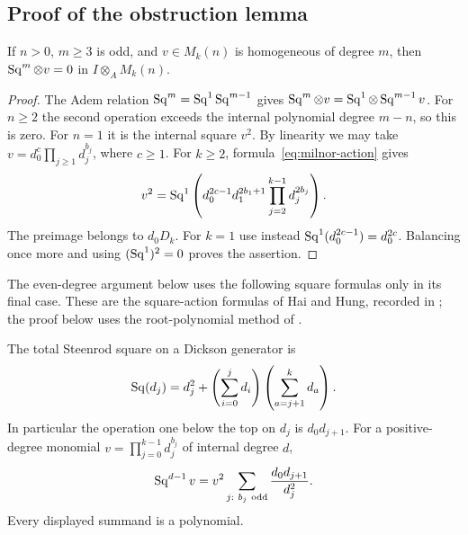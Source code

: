 \subsection{Proof of the obstruction lemma}

\begin{lemma}\label{lem:algebra-odd-tensor}
If $n>0$, $m\geq3$ is odd, and $v\in M_k(n)$ is homogeneous of
degree $m$, then $\operatorname{Sq}^m\otimes v=0$ in $I\otimes_AM_k(n)$.
\end{lemma}

\begin{proof}
The Adem relation $\operatorname{Sq}^m=\operatorname{Sq}^1\operatorname{Sq}^{m-1}$ gives
$\operatorname{Sq}^m\otimes v=\operatorname{Sq}^1\otimes\operatorname{Sq}^{m-1}v$.
For $n\geq2$ the second operation exceeds the internal polynomial
degree $m-n$, so this is zero.  For $n=1$ it is the internal square
$v^2$.  By linearity we may take
$v=d_0^c\prod_{j\geq1}d_j^{b_j}$, where $c\geq1$.
For $k\geq2$, formula~\eqref{eq:milnor-action} gives
\[
 v^2=\operatorname{Sq}^1\left(
 d_0^{2c-1}d_1^{2b_1+1}\prod_{j=2}^{k-1}d_j^{2b_j}
 \right).
\]
The preimage belongs to $d_0D_k$.  For $k=1$ use instead
$\operatorname{Sq}^1(d_0^{2c-1})=d_0^{2c}$.  Balancing once more and using
$(\operatorname{Sq}^1)^2=0$ proves the assertion.
\end{proof}

The even-degree argument below uses the following square formulas
only in its final case. These are the square-action formulas of Hai and Hung,
recorded in \cite[Theorem~B]{Hung1991}; the proof below uses the
root-polynomial method of \cite[\S II]{Wilkerson1983}.

\begin{lemma}\label{lem:algebra-near-top-square}
The total Steenrod square on a Dickson generator is
\begin{equation}\label{eq:algebra-total-dickson-square}
 \operatorname{Sq}(d_j)=d_j^2+
       \left(\sum_{i=0}^jd_i\right)
       \left(\sum_{a=j+1}^kd_a\right).
\end{equation}
In particular the operation one below the top on $d_j$ is
$d_0d_{j+1}$.  For a positive-degree monomial
$v=\prod_{j=0}^{k-1}d_j^{b_j}$ of internal degree $d$,
\begin{equation}\label{eq:algebra-one-below-top}
 \operatorname{Sq}^{d-1}v
 =v^2\sum_{j:\ b_j\ \text{odd}}\frac{d_0d_{j+1}}{d_j^2}.
\end{equation}
Every displayed summand is a polynomial.
\end{lemma}

